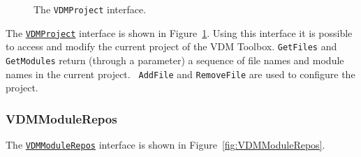 \documentclass[\pformat,12pt]{article}
\newcommand{\VDMModuleRepos}{\hyperlink{interface.VDMModuleRepos}{VDMModuleRepos}}
\newcommand{\VDMProject}{\hyperlink{interface.VDMProject}{VDMProject}}
\begin{document}
\begin{figure}[tbh]
\begin{center}
\mbox{}
\caption{The {\tt VDMProject} interface.}\label{fig:VDMProject}
\end{center}
\end{figure}




The {\tt \VDMProject} interface is shown in
Figure~\ref{fig:VDMProject}.  Using this interface it is possible to
access and modify the current project of the VDM Toolbox. 
{\tt GetFiles} and {\tt GetModules} return (through a parameter) a
sequence of file names and module names in the current project. {\tt
  AddFile} and {\tt RemoveFile} are used to configure the project.

\subsubsection{VDMModuleRepos}

The {\tt \VDMModuleRepos} interface is shown in
Figure~\ref{fig:VDMModuleRepos}.
\end{document}
